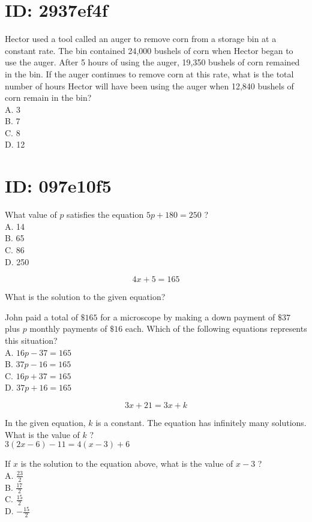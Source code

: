 

\section*{ID: 2937ef4f}
Hector used a tool called an auger to remove corn from a storage bin at a constant rate. The bin contained 24,000 bushels of corn when Hector began to use the auger. After 5 hours of using the auger, 19,350 bushels of corn remained in the bin. If the auger continues to remove corn at this rate, what is the total number of hours Hector will have been using the auger when 12,840 bushels of corn remain in the bin?\\
A. 3\\
B. 7\\
C. 8\\
D. 12

\section*{ID: 097e10f5}
What value of $p$ satisfies the equation $5 p+180=250$ ?\\
A. 14\\
B. 65\\
C. 86\\
D. 250

$$
4 x+5=165
$$

What is the solution to the given equation?

John paid a total of $\$ 165$ for a microscope by making a down payment of $\$ 37$ plus $p$ monthly payments of $\$ 16$ each. Which of the following equations represents this situation?\\
A. $16 p-37=165$\\
B. $37 p-16=165$\\
C. $16 p+37=165$\\
D. $37 p+16=165$

$$
3 x+21=3 x+k
$$

In the given equation, $k$ is a constant. The equation has infinitely many solutions. What is the value of $k$ ?\\
$3(2 x-6)-11=4(x-3)+6$

If $x$ is the solution to the equation above, what is the value of $x-3$ ?\\
A. $\frac{23}{2}$\\
B. $\frac{17}{2}$\\
C. $\frac{15}{2}$\\
D. $-\frac{15}{2}$

